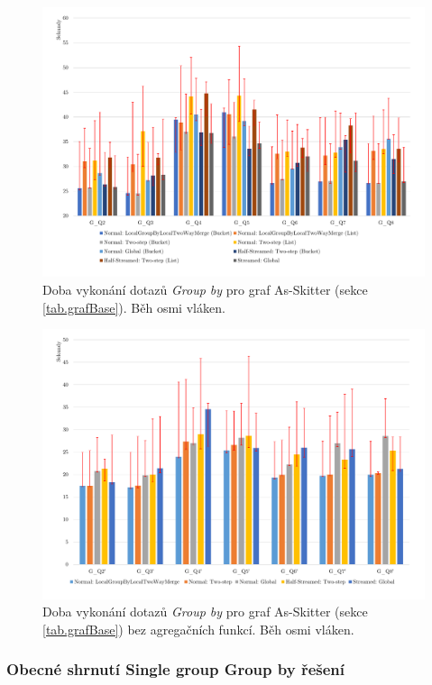 \begin{figure}[!htp]
\includegraphics[width=\linewidth]{../img/skitterGroupByPar.pdf}\centering
\caption{Doba vykonání dotazů \textit{Group by} pro graf As-Skitter (sekce \ref{tab.grafBase}). Běh osmi vláken.}
\label{figure.skitterGroupByPar}
\end{figure}
\begin{figure}[!htp]
\includegraphics[width=\linewidth]{../img/skitterGroupByParNoAgg.pdf}\centering
\caption{Doba vykonání dotazů \textit{Group by} pro graf As-Skitter (sekce \ref{tab.grafBase}) bez agregačních funkcí. Běh osmi vláken.}
\label{figure.skitterGroupByParNoAgg}
\end{figure}
\bigskip

\subsubsection{Obecné shrnutí Single group Group by řešení} \label{expr.results.groupby.sinleGroup}

